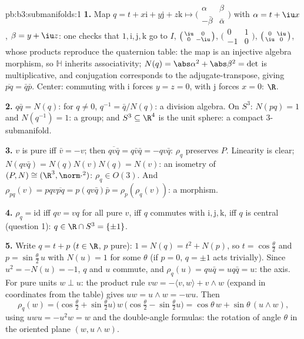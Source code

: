 \begin{solution}{pb:b3:submanifolds:1}
\textbf{1.} Map $q = t + x\mathrm i + y\mathrm j + z\mathrm k
\mapsto \bigl(\begin{smallmatrix}\alpha & \beta\\ -\bar\beta
& \bar\alpha\end{smallmatrix}\bigr)$ with $\alpha = t + \iu
x$, $\beta = y + \iu z$: one checks that $1, \mathrm i,
\mathrm j, \mathrm k$ go to $I$, $\bigl(\begin{smallmatrix}
\iu & 0\\ 0 & -\iu\end{smallmatrix}\bigr)$,
$\bigl(\begin{smallmatrix}0 & 1\\ -1 &
0\end{smallmatrix}\bigr)$, $\bigl(\begin{smallmatrix}0 &
\iu\\ \iu & 0\end{smallmatrix}\bigr)$, whose products
reproduce the quaternion table: the map is an injective
algebra morphism, so $\mathbb H$ inherits associativity;
$N(q) = \abs\alpha^2 + \abs\beta^2 = \det$ is multiplicative,
and conjugation corresponds to the adjugate-transpose,
giving $\overline{pq} = \bar q\bar p$. Center: commuting
with $\mathrm i$ forces $y = z = 0$, with $\mathrm j$ forces
$x = 0$: $\R$.

\textbf{2.} $q\bar q = N(q)$: for $q \neq 0$, $q^{-1} = \bar
q/N(q)$: a division algebra. On $S^3$: $N(pq) = 1$ and
$N(q^{-1}) = 1$: a group; and $S^3 \subseteq \R^4$ is the
unit sphere: a compact $3$-submanifold.

\textbf{3.} $v$ is pure iff $\bar v = -v$; then
$\overline{qv\bar q} = q\bar v\bar q = -qv\bar q$: $\rho_q$
preserves $P$. Linearity is clear; $N(qv\bar q) =
N(q)N(v)N(q) = N(v)$: an isometry of $(P, N) \cong (\R^3,
\norm\cdot^2)$: $\rho_q \in O(3)$. And $\rho_{pq}(v) =
pqv\overline{pq} = p(qv\bar q)\bar p =
\rho_p(\rho_q(v))$: a morphism.

\textbf{4.} $\rho_q = \mathrm{id}$ iff $qv = vq$ for all pure
$v$, iff $q$ commutes with $\mathrm i, \mathrm j, \mathrm k$,
iff $q$ is central (question 1): $q \in \R\cap S^3 =
\{\pm1\}$.

\textbf{5.} Write $q = t + p$ ($t \in \R$, $p$ pure): $1 =
N(q) = t^2 + N(p)$, so $t = \cos\frac\theta2$ and $p =
\sin\frac\theta2\,u$ with $N(u) = 1$ for some $\theta$
(if $p = 0$, $q = \pm1$ acts trivially). Since $u^2 = -N(u)
= -1$, $q$ and $u$ commute, and $\rho_q(u) = qu\bar q =
uq\bar q = u$: the axis. For pure units $w \perp u$: the
product rule $vw = -\langle v, w\rangle + v\wedge w$
(expand in coordinates from the table) gives $uw = u\wedge w
= -wu$. Then
\[
\rho_q(w) = \bigl(\cos\tfrac\theta2 +
\sin\tfrac\theta2u\bigr)\,w\,\bigl(\cos\tfrac\theta2 -
\sin\tfrac\theta2u\bigr)
= \cos\theta\,w + \sin\theta\,(u\wedge w),
\]
using $uwu = -u^2w = w$ and the double-angle formulas: the
rotation of angle $\theta$ in the oriented plane $(w,
u\wedge w)$.


\end{solution}
